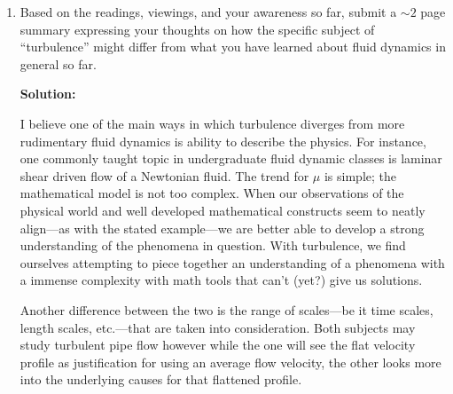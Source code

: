 \documentclass[12pt]{article}
\newenvironment{Solution}
    {\textbf{Solution:}
    
    \vspace{5mm}
    \begin{tcolorbox}
    }
    {
    \end{tcolorbox}
    \vspace{5mm}
    }
\begin{document}
\begin{enumerate}
\begin{Solution}
\begin{equation}
    \frac{1}{2}u_{noise}' u_{noise}' = \int_0 ^\frac{1}{100} 0.0038 k^{-5/3} dk = 0.0057\left[ 0.01^{-2/3} - 0\right] = 0.1228
\end{equation}
\begin{equation}
    \boxed{u_{noise} = \SI{0.5}{\meter\per\second}} \qquad \boxed{\frac{u_{noise}}{\bar{u}}  = 0.00991}
\end{equation}

\end{Solution}
\newpage
\item Based on the readings, viewings, and your awareness so far, submit a $\sim2$ page summary expressing your thoughts on how the specific subject of “turbulence” might differ from what you have learned about fluid dynamics in general so far.

\begin{Solution}
\par{I believe one of the main ways in which turbulence diverges from more rudimentary fluid dynamics is ability to describe the physics. For instance, one commonly taught topic in undergraduate fluid dynamic classes is laminar shear driven flow of a Newtonian fluid. The trend for $\mu$ is simple; the mathematical model is not too complex. When our observations of the physical world and well developed mathematical constructs seem to neatly align---as with the stated example---we are better able to develop a strong understanding of the phenomena in question. With turbulence, we find ourselves attempting to piece together an understanding of a phenomena with a immense complexity with math tools that can't (yet?) give us solutions. }
\vspace{1mm}
\par{Another difference between the two is the range of scales---be it time scales, length scales, etc.---that are taken into consideration. Both subjects may study turbulent pipe flow however while the one will see the flat velocity profile as justification for using an average flow velocity, the other looks more into the underlying causes for that flattened profile. }

\end{Solution}


\end{enumerate}
\end{document}
